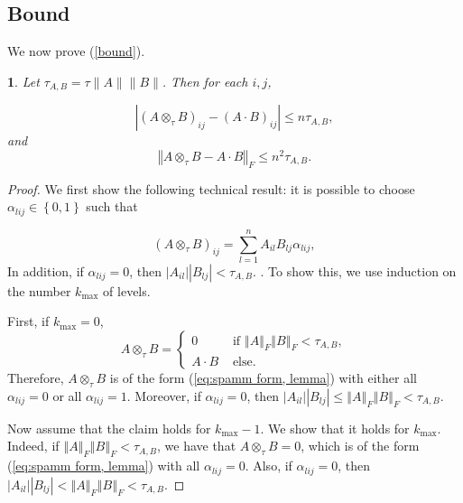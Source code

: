 \documentclass[letterpaper,twocolumn,amsmath,amsfont,amssymb,english,aps,jcp,preprintnumbers,groupaddress,nofootinbib,tightenlines,floatfix]{revtex4}
\theoremstyle{plain}
\theoremstyle{remark}
\theoremstyle{plain}
\newtheorem{prop}[thm]{\protect\propositionname}
\providecommand{\propositionname}{Proposition}
\begin{document}
\subsection{Bound}

We now prove (\ref{bound}).

\begin{prop}
\label{lem:SpAMM mult, prop}
Let $\tau_{A,B} = \tau \| A \| \| B \| $. Then for each $i,j$,

\[
\left|\left(A\otimes_{\tau}B\right)_{ij}-\left(A\cdot B\right)_{ij}\right|\leq n\tau_{A,B},
\]
and
\[
\left\Vert A\otimes_{\tau}B-A\cdot B\right\Vert _{F}\leq n^{2}\tau_{A,B}.
\]
\end{prop}

\begin{proof}


We first show the following technical result: it is possible to choose $\alpha_{lij}\in\left\{ 0,1\right\} $ such that 

\begin{equation}
\left(A\otimes_{\tau}B\right)_{ij}=\sum_{l=1}^{n}A_{il}B_{lj}\alpha_{lij},\label{eq:spamm form, lemma}
\end{equation}
In addition, if $\alpha_{lij}=0$, then \textup{$\left|A_{il}\right|\left|B_{lj}\right|<\tau_{A,B}$. }. To show this, we use 
induction on the number $k_{\max}$ of levels. 

First, if $k_{\max}=0$,
\[
A\otimes_{\tau}B=\begin{cases}
0 & \,\,\text{if}\,\,\left\Vert A\right\Vert _{F}\left\Vert B\right\Vert _{F}<\tau_{A,B},\\
A\cdot B & \,\,\text{else}.
\end{cases}
\]
Therefore, $A\otimes_{\tau}B$ is of the form (\ref{eq:spamm form, lemma})
with either all $\alpha_{lij}=0$ or all $\alpha_{lij}=1$. Moreover,
if $\alpha_{lij}=0$, then $\left|A_{il}\right|\left|B_{lj}\right|\leq\left\Vert A\right\Vert _{F}\left\Vert B\right\Vert _{F}<\tau_{A,B}$. 

Now assume that the claim holds for $k_{\max}-1$. We show that it
holds for $k_{\max}$. Indeed, if $\left\Vert A\right\Vert _{F}\left\Vert B\right\Vert _{F}<\tau_{A,B}$,
we have that $A\otimes_{\tau}B=0$, which is of the form (\ref{eq:spamm form, lemma})
with all $\alpha_{lij}=0$. Also, if $\alpha_{lij}=0$, then $\left|A_{il}\right|\left|B_{lj}\right|<\left\Vert A\right\Vert _{F}\left\Vert B\right\Vert _{F}<\tau_{A,B}$.


\end{proof}
\end{document}
